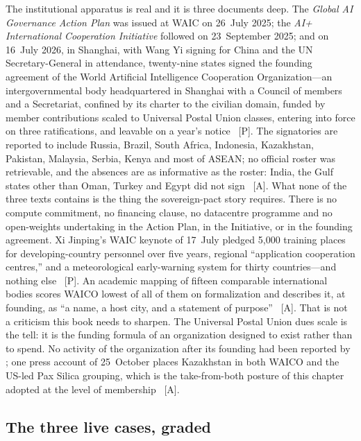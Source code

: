 The institutional apparatus is real and it is three documents deep. The \emph{Global AI Governance Action Plan} was issued at WAIC on 26~July 2025; the \emph{AI+ International Cooperation Initiative} followed on 23~September 2025; and on 16~July 2026, in Shanghai, with Wang Yi signing for China and the UN Secretary-General in attendance, twenty-nine states signed the founding agreement of the World Artificial Intelligence Cooperation Organization---an intergovernmental body headquartered in Shanghai with a Council of members and a Secretariat, confined by its charter to the civilian domain, funded by member contributions scaled to Universal Postal Union classes, entering into force on three ratifications, and leavable on a year's notice~\cite{waico} [P]. The signatories are reported to include Russia, Brazil, South Africa, Indonesia, Kazakhstan, Pakistan, Malaysia, Serbia, Kenya and most of ASEAN; no official roster was retrievable, and the absences are as informative as the roster: India, the Gulf states other than Oman, Turkey and Egypt did not sign~\cite{waico} [A]. What none of the three texts contains is the thing the sovereign-pact story requires. There is no compute commitment, no financing clause, no datacentre programme and no open-weights undertaking in the Action Plan, in the Initiative, or in the founding agreement. Xi Jinping's WAIC keynote of 17~July pledged 5{,}000 training places for developing-country personnel over five years, regional ``application cooperation centres,'' and a meteorological early-warning system for thirty countries---and nothing else~\cite{waico} [P]. An academic mapping of fifteen comparable international bodies scores WAICO lowest of all of them on formalization and describes it, at founding, as ``a name, a host city, and a statement of purpose''~\cite{waico} [A]. That is not a criticism this book needs to sharpen. The Universal Postal Union dues scale is the tell: it is the funding formula of an organization designed to exist rather than to spend. No activity of the organization after its founding had been reported by \datafreeze; one press account of 25~October places Kazakhstan in both WAICO and the US-led Pax Silica grouping, which is the take-from-both posture of this chapter adopted at the level of membership~\cite{gov-waico-blocs} [A].

\subsection{The three live cases, graded}

